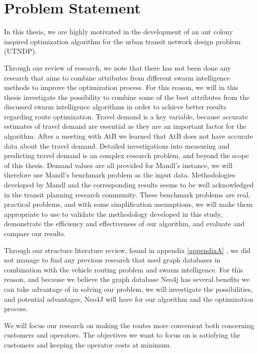 \section{Problem Statement}
In this thesis, we are highly motivated in the development of an ant colony inspired optimization algorithm for the urban transit network design problem (UTNDP).  

Through our review of research, we note that there has not been done any research that aims to combine attributes from different swarm intelligence methods to improve the optimization process. For this reason, we will in this thesis investigate the possibility to combine some of the best attributes from the discussed swarm intelligence algorithms in order to achieve better results regarding route optimization. Travel demand is a key variable, because accurate estimates of travel demand are essential as they are an important factor for the algorithm. After a meeting with AtB we learned that AtB does not have accurate data about the travel demand. Detailed investigations into measuring and predicting travel demand is an complex research problem, and beyond the scope of this thesis. Demand values are all provided for Mandl's instance, we will therefore use Mandl's benchmark problem \citep{mandl79} as the input data. Methodologies developed by Mandl and the corresponding results seems to be well acknowledged in the transit planning research community. These benchmark problems are real, practical problems, and with some simplification assumptions, we will make them appropriate to use to validate the methodology developed in this study, demonstrate the efficiency and effectiveness of our algorithm, and evaluate and compare our results. 

Through our structure literature review, found in appendix \ref{appendixA}%
, we did not manage to find any previous research that used graph databases in combination with the vehicle routing problem and swarm intelligence.
For this reason, and because we believe the graph database Neo4j \citep{website:neo4j} has several benefits we can take advantage of in solving our problem, %
we will investigate the possibilities, and potential advantages, Neo4J will have for our algorithm and the optimization process. 

We will focus our research on making the routes more convenient both concerning customers and operators. The objectives we want to focus on is satisfying the customers and keeping the operator costs at minimum. 

